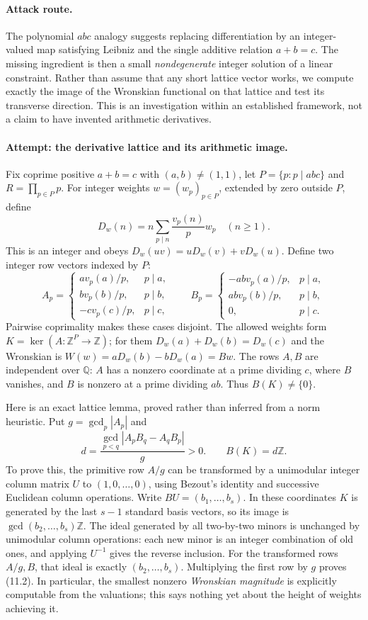 \documentclass[11pt,a4paper]{article}
\newcommand{\Z}{\mathbb{Z}}
\newcommand{\Q}{\mathbb{Q}}
\begin{document}
\paragraph{Attack route.}
The polynomial $abc$ analogy suggests replacing differentiation by an
integer-valued map satisfying Leibniz and the single additive relation
$a+b=c$. The missing ingredient is then a small \emph{nondegenerate}
integer solution of a linear constraint. Rather than assume that any
short lattice vector works, we compute exactly the image of the
Wronskian functional on that lattice and test its transverse direction.
This is an investigation within an established framework, not a claim
to have invented arithmetic derivatives.

\paragraph{Attempt: the derivative lattice and its arithmetic image.}
Fix coprime positive $a+b=c$ with $(a,b)\ne(1,1)$, let
$P=\{p:p\mid abc\}$ and $R=\prod_{p\in P}p$. For integer weights
$w=(w_p)_{p\in P}$, extended by zero outside $P$, define
\[
 D_w(n)=n\sum_{p\mid n}\frac{v_p(n)}p w_p\quad(n\geq1).
\]
This is an integer and obeys $D_w(uv)=uD_w(v)+vD_w(u)$.
Define two integer row vectors indexed by $P$:
\[
 A_p=\begin{cases}a v_p(a)/p,&p\mid a,\\
 b v_p(b)/p,&p\mid b,\\-c v_p(c)/p,&p\mid c,
 \end{cases}\qquad
 B_p=\begin{cases}-ab v_p(a)/p,&p\mid a,\\
 ab v_p(b)/p,&p\mid b,\\0,&p\mid c.
 \end{cases} \tag{11.1}
\]
Pairwise coprimality makes these cases disjoint. The allowed weights
form $K=\ker(A:\Z^P\to\Z)$; for them
$D_w(a)+D_w(b)=D_w(c)$ and the Wronskian is
$W(w)=aD_w(b)-bD_w(a)=Bw$. The rows $A,B$ are independent over $\Q$:
$A$ has a nonzero coordinate at a prime dividing $c$, where $B$ vanishes,
and $B$ is nonzero at a prime dividing $ab$. Thus $B(K)\ne\{0\}$.

Here is an exact lattice lemma, proved rather than inferred from a norm
heuristic. Put $g=\gcd_p|A_p|$ and
\[
 d=\frac{\gcd_{p<q}|A_pB_q-A_qB_p|}{g}>0.
 \qquad B(K)=d\Z. \tag{11.2}
\]
To prove this, the primitive row $A/g$ can be transformed by a unimodular
integer column matrix $U$ to $(1,0,\ldots,0)$, using Bezout's identity
and successive Euclidean column operations. Write
$BU=(b_1,\ldots,b_s)$. In these coordinates $K$ is generated by the
last $s-1$ standard basis vectors, so its image is
$\gcd(b_2,\ldots,b_s)\Z$. The ideal generated by all two-by-two minors
is unchanged by unimodular column operations: each new minor is an
integer combination of old ones, and applying $U^{-1}$ gives the
reverse inclusion. For the transformed rows $A/g,B$, that ideal is
exactly $(b_2,\ldots,b_s)$. Multiplying the first row by $g$ proves
(11.2). In particular, the smallest nonzero \emph{Wronskian magnitude}
is explicitly computable from the valuations; this says nothing yet
about the height of weights achieving it.
\end{document}
